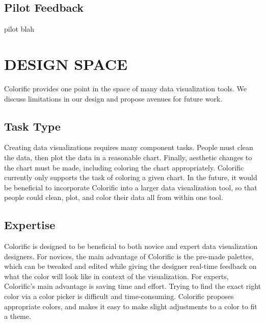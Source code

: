 \documentclass{article}
\newcommand{\system}{Colorific\xspace}
\begin{document}

\subsection{Pilot Feedback}
pilot blah

\section{DESIGN SPACE}
Colorific provides one point in the space of many data visualization tools. We discuss limitations in our design and propose avenues for future work. 

\subsection{Task Type}
Creating data visualizations requires many component tasks. People must clean the data, then plot the data in a reasonable chart. Finally, aesthetic changes to the chart must be made, including coloring the chart appropriately. Colorific currently only supports the task of coloring a given chart. In the future, it would be beneficial to incorporate \system into a larger data visualization tool, so that people could clean, plot, and color their data all from within one tool. 

\subsection{Expertise}
Colorific is designed to be beneficial to both novice and expert data visualization designers. For novices, the main advantage of Colorific is the pre-made palettes, which can be tweaked and edited while giving the designer real-time feedback on what the color will look like in context of the visualization. For experts, Colorific's main advantage is saving time and effort. Trying to find the exact right color via a color picker is difficult and time-consuming. \system proposes appropriate colors, and makes it easy to make slight adjustments to a color to fit a theme. 
\end{document}
